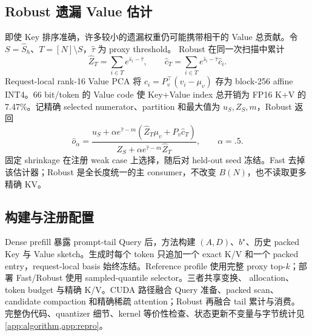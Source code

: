 \subsection{Robust 遗漏 Value 估计}

即使 Key 排序准确，许多较小的遗漏权重仍可能携带相干的 Value 总贡献。令
$S=\widehat S_h$、$T=[N]\setminus S$，$\widehat\tau$ 为 proxy threshold。
Robust 在同一次扫描中累计
\begin{equation}
 \widehat Z_T=\sum_{i\in T}e^{\widehat s_i-\widehat\tau},\qquad
 \widehat c_T=\sum_{i\in T}e^{\widehat s_i-\widehat\tau}\widehat c_i.
 \label{eq:value-tail-statistics}
\end{equation}
Request-local rank-16 Value PCA 将 $c_i=P_v^\top(v_i-\mu_v)$ 存为
block-256 affine INT4。66 bit/token 的 Value code 使 Key+Value index 总开销为
FP16 K+V 的 7.47\%。记精确 selected numerator、partition 和最大值为
$u_S,Z_S,m$，Robust 返回
\begin{equation}
 \widehat o_\alpha=
 \frac{u_S+\alpha e^{\widehat\tau-m}
 (\widehat Z_T\mu_v+P_v\widehat c_T)}
 {Z_S+\alpha e^{\widehat\tau-m}\widehat Z_T},\qquad\alpha=.5.
 \label{eq:robust-tail-output}
\end{equation}
固定 shrinkage 在注册 weak case 上选择，随后对 held-out seed 冻结。Fast 去掉
该估计器；Robust 是全长度统一的主 consumer，不改变 $B(N)$，也不读取更多
精确 KV。

\subsection{构建与注册配置}

Dense prefill 暴露 prompt-tail Query 后，方法构建 $(A,D)$、$b^\star$、历史
packed Key 与 Value sketch。生成时每个 token 只追加一个 exact K/V 和一个
packed entry，request-local basis 始终冻结。Reference profile 使用完整 proxy
top-$k$；部署 Fast/Robust 使用 sampled-quantile selector。三者共享变换、
allocation、token budget 与精确 K/V。CUDA 路径融合 Query 准备、packed scan、
candidate compaction 和精确稀疏 attention；Robust 再融合 tail 累计与消费。
完整伪代码、quantizer 细节、kernel 等价性检查、状态更新不变量与字节统计见
\cref{app:algorithm,app:repro}。
